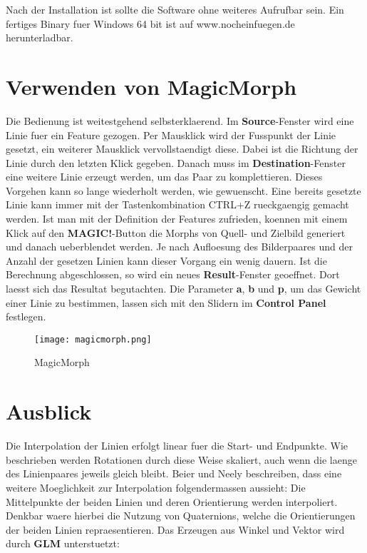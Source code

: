 Nach der Installation ist sollte die Software ohne weiteres Aufrufbar sein. Ein fertiges Binary fuer Windows 64 bit ist auf 
www.nocheinfuegen.de herunterladbar.

\section{Verwenden von MagicMorph}

Die Bedienung ist weitestgehend selbsterklaerend. Im \textbf{Source}-Fenster wird eine Linie fuer ein Feature gezogen. Per
Mausklick wird der Fusspunkt der Linie gesetzt, ein weiterer
Mausklick vervollstaendigt diese. Dabei ist die Richtung der Linie
durch den letzten Klick gegeben. Danach muss
im \textbf{Destination}-Fenster eine weitere Linie erzeugt werden, um das
Paar zu komplettieren. Dieses Vorgehen kann so lange wiederholt
werden, wie gewuenscht. Eine bereits gesetzte Linie kann immer mit
der Tastenkombination CTRL+Z rueckgaengig gemacht werden.
Ist man mit der Definition der Features zufrieden, koennen mit einem
Klick auf den \textbf{MAGIC!}-Button die Morphs von Quell- und Zielbild
generiert und danach ueberblendet werden. Je nach Aufloesung des Bilderpaares
und der Anzahl der gesetzen Linien kann dieser Vorgang ein wenig
dauern. Ist die Berechnung abgeschlossen, so wird ein
neues \textbf{Result}-Fenster geoeffnet. Dort laesst sich das
Resultat begutachten. Die Parameter \textbf{a}, \textbf{b} und
\textbf{p}, um das Gewicht einer Linie zu bestimmen, lassen
sich mit den Slidern im \textbf{Control Panel} festlegen.

\begin{figure}[htb]
	\centering
	\texttt{[image: magicmorph.png]}
	\caption{MagicMorph}
	\label{fig:powermorph}
\end{figure}

\section{Ausblick}

Die Interpolation der Linien erfolgt linear fuer die Start-
und Endpunkte. Wie beschrieben werden Rotationen durch
diese Weise skaliert, auch wenn die laenge des Linienpaares
jeweils gleich bleibt. Beier und Neely beschreiben,
dass eine weitere Moeglichkeit zur Interpolation folgendermassen
aussieht:
Die Mittelpunkte der beiden Linien und deren Orientierung
werden interpoliert. Denkbar waere hierbei die Nutzung
von Quaternions, welche die Orientierungen der beiden
Linien repraesentieren. Das Erzeugen aus Winkel
und Vektor wird durch \textbf{GLM} unterstuetzt:

